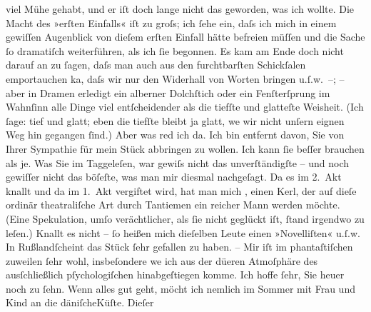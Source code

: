 \begin{ledgroupsized}[t]{13cm}
               viel Mühe gehabt, und er iſt doch lange nicht das geworden, was ich wollte. Die Macht
               des »erſten Einfalls« iſt zu groſs; ich ſehe ein, daſs ich {\pb}mich in einem gewiſſen Augenblick von dieſem
               erſten Einfall hätte befreien \introOben{}müſſen\introOben{} und die Sache ſo
               dramatiſch weiterführen, als ich ſie begonnen. Es kam am Ende doch nicht darauf an zu
               ſagen, daſs man auch aus den furchtbarſten Schickſalen emportauchen ka{\geminationn}, daſs wir nur den Widerhall von Worten bringen
               u.ſ.w. –; – aber in Dramen erledigt ein alberner Dolchſtich {\pb}oder ein Fenſterſprung im Wahnſinn alle Dinge viel
               entſcheidender als die tiefſte und glatteſte Weisheit. (Ich ſage: tief und glatt;
               eben die tiefſte bleibt ja glatt, we{\geminationn} wir nicht unſern
               eignen Weg hin gegangen ſind.) Aber was red ich da. Ich bin entfernt davon, Sie von
               Ihrer Sympathie für mein Stück abbringen zu wollen. Ich kann ſie beſſer brauchen als
               je. Was Sie im Taggeleſen, war {\pb}gewiſs nicht das unverſtändigſte – und noch
               gewiſſer nicht das böſeſte, was man mir diesmal nachgeſagt. Da es im 2. Akt knallt
               und da im 1. Akt vergiftet wird, hat man mich \label{K_L01590_1v}\label{K_L01590_1h}, einen Kerl, der auf dieſe ordinär
               theatraliſche Art durch Tantiemen ein reicher Mann werden möchte. (Eine Spekulation,
               umſo verächtlicher, als ſie nicht geglückt iſt, ſtand irgendwo zu {\pb}leſen.) Knallt es nicht – ſo heißen mich dieſelben
               Leute einen »Novelliſten« u.ſ.w. In Rußlandſcheint das Stück ſehr gefallen zu haben. – Mir iſt
               im phantaſtiſchen zuweilen ſehr wohl, insbeſondere we{\geminationn}
               ich aus der dü{\geminationn}eren Atmoſphäre des ausſchließlich
               pſychologiſchen hinabgeſtiegen komme.\pend
           \pstart
           Ich hoffe ſehr, Sie heuer noch zu ſehn. Wenn alles gut geht, möcht ich nemlich im
               Sommer mit Frau und Kind an die däniſcheKüſte. Dieſer \label{K_L01590_2v}
\end{ledgroupsized}
